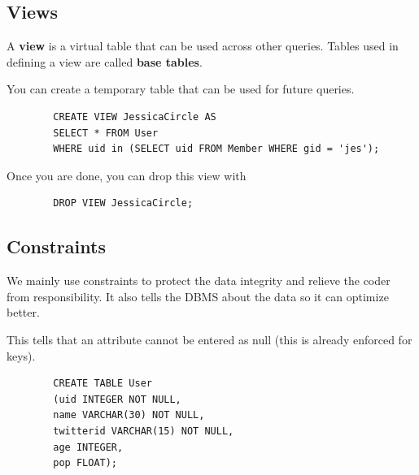 \documentclass{article}
\begin{document}
  \subsection{Views}

    \begin{definition}[View]
      A \textbf{view} is a virtual table that can be used across other queries. Tables used in defining a view are called \textbf{base tables}. 
    \end{definition}

    \begin{example}
      You can create a temporary table that can be used for future queries. 
      \begin{lstlisting}
        CREATE VIEW JessicaCircle AS 
        SELECT * FROM User 
        WHERE uid in (SELECT uid FROM Member WHERE gid = 'jes'); 
      \end{lstlisting}
      Once you are done, you can drop this view with 
      \begin{lstlisting}
        DROP VIEW JessicaCircle; 
      \end{lstlisting}
    \end{example}

  \subsection{Constraints}

    We mainly use constraints to protect the data integrity and relieve the coder from responsibility. It also tells the DBMS about the data so it can optimize better. 

    \begin{definition}
      This tells that an attribute cannot be entered as null (this is already enforced for keys). 
      \begin{lstlisting}
        CREATE TABLE User 
        (uid INTEGER NOT NULL, 
        name VARCHAR(30) NOT NULL, 
        twitterid VARCHAR(15) NOT NULL, 
        age INTEGER, 
        pop FLOAT); 
      \end{lstlisting}
    \end{definition}
\end{document}

